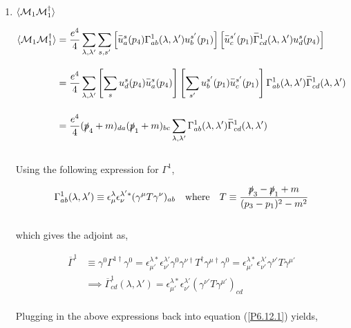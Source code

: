 \begin{solution}
\begin{enumerate}[label=(\alph*)]
    \item $\langle \mathcal{M}_1\mathcal{M}_1^\dagger \rangle $
    
    \begin{align}
        \expval{\mathcal{M}_1\mathcal{M}_1^\dagger} &= \frac{e^4}{4}  \sum_{\lambda,\lambda'} \sum_{s,s'} \left[  \overbar{u}^s_a(p_4) \Gamma^1_{ab}(\lambda,\lambda')u^{s'}_b(p_1)\right] \left[  \overbar{u}^{s'}_c(p_1)\overbar{\Gamma}^1_{cd}(\lambda,\lambda')u^s_d(p_4)\right] \nonumber \\[0.12in]
        &=  \frac{e^4}{4} \sum_{\lambda,\lambda'} \left[ \sum_{s} u^s_d(p_4) \overbar{u}^s_a(p_4) \right]  \left[ \sum_{s'}u^{s'}_b(p_1)   \overbar{u}^{s'}_c(p_1) \right] \Gamma^1_{ab}(\lambda,\lambda') \overbar{\Gamma}^1_{cd}(\lambda,\lambda') \nonumber \\[0.15in]
        &= \frac{e^4}{4}  (\pslash_4+m)_{da}  (\pslash_1+m)_{bc}  \sum_{\lambda,\lambda'} \Gamma^1_{ab}(\lambda,\lambda') \overbar{\Gamma}^1_{cd}(\lambda,\lambda') \label{P6.12.1}
    \end{align}\\
    Using the following expression for $\Gamma^1$,

    \begin{align*}
        \Gamma^1_{ab}(\lambda,\lambda') \equiv \epsilon^\lambda_\mu \epsilon^{\lambda' \ast}_\nu (\gamma^\mu T \gamma^\nu)_{ab} \quad \text{where} \quad T \equiv \frac{\slashed{p}_3-\slashed{p}_1+m}{(p_3-p_1)^2-m^2}
    \end{align*}\\
    which gives the adjoint as,

    \begin{align*}
        \overbar{\Gamma}^1 &\equiv \gamma^0 \Gamma^{1\dagger} \gamma^0  = \epsilon^{\lambda\ast}_{\mu'} \epsilon^{\lambda'}_{\nu'} \gamma^0 \gamma^{\nu\dagger} T^\dagger \gamma^{\mu\dagger} \gamma^0 =  \epsilon^{\lambda\ast}_{\mu'} \epsilon^{\lambda'}_{\nu'} \gamma^{\nu'} T \gamma^{\mu'} \\[0.15in]
        &\implies \overbar{\Gamma}^1_{cd}(\lambda,\lambda') = \epsilon^{\lambda\ast}_{\mu'} \epsilon^{\lambda'}_{\nu'} (\gamma^{\nu'} T \gamma^{\mu'})_{cd}
    \end{align*}\\
    Plugging in the above expressions back into equation (\ref{P6.12.1}) yields,


\end{enumerate}
\end{solution}
